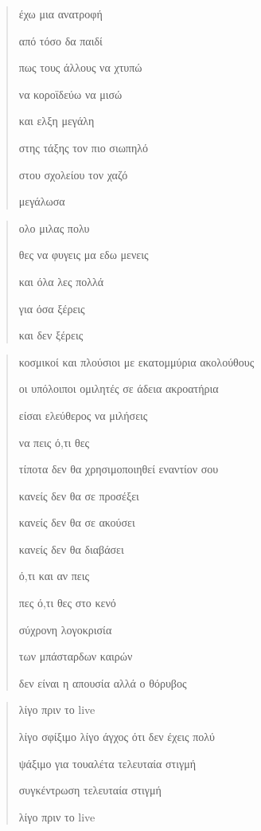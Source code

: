 \documentclass[12pt]{article}
\begin{document}
\begin{verse}
  έχω μια ανατροφή

  από τόσο δα παιδί

  πως τους άλλους να χτυπώ

  να κοροϊδεύω να μισώ



  και ελξη μεγάλη

  στης τάξης τον πιο σιωπηλό

  στου σχολείου τον χαζό

  μεγάλωσα



\end{verse}

\begin{verse}
  ολο μιλας πολυ

  θες να φυγεις μα εδω μενεις

  και όλα λες πολλά

  για όσα ξέρεις

  και δεν ξέρεις


\end{verse}

\begin{verse}
  κοσμικοί και πλούσιοι με εκατομμύρια ακολούθους

  οι υπόλοιποι ομιλητές σε άδεια ακροατήρια

  είσαι ελεύθερος να μιλήσεις

  να πεις ό,τι θες

  τίποτα δεν θα χρησιμοποιηθεί εναντίον σου

  κανείς δεν θα σε προσέξει

  κανείς δεν θα σε ακούσει

  κανείς δεν θα διαβάσει

  ό,τι και αν πεις

  πες ό,τι θες στο κενό

  σύχρονη λογοκρισία

  των μπάσταρδων καιρών

  δεν είναι η απουσία αλλά ο θόρυβος

\end{verse}

\begin{verse}
  λίγο πριν το live

  λίγο σφίξιμο λίγο άγχος ότι δεν έχεις πολύ

  ψάξιμο για τουαλέτα τελευταία στιγμή

  συγκέντρωση τελευταία στιγμή

  λίγο πριν το live
\end{verse}
\end{document}
